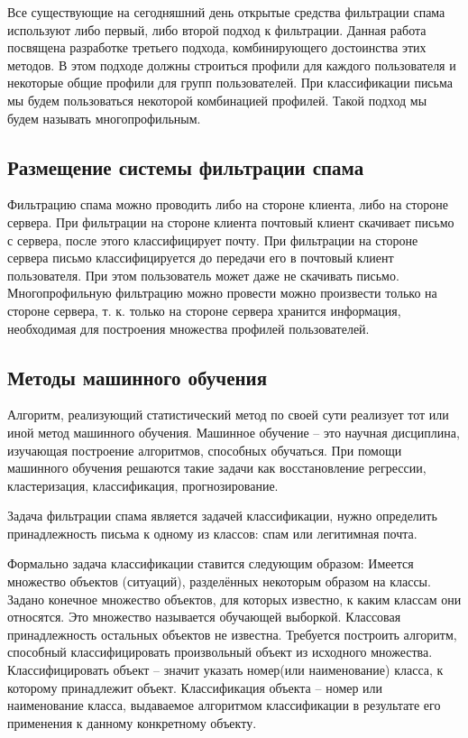 Все существующие на сегодняшний день открытые средства фильтрации спама используют либо первый, либо второй подход к фильтрации. Данная работа посвящена разработке третьего подхода, комбинирующего достоинства этих методов. В этом подходе должны строиться профили для каждого пользователя  и некоторые общие профили для групп пользователей. При классификации письма мы будем пользоваться некоторой комбинацией профилей. Такой подход мы будем называть многопрофильным.

\subsection{Размещение системы фильтрации  спама}
Фильтрацию спама можно проводить либо на стороне клиента, либо на стороне сервера.  При фильтрации на стороне клиента почтовый клиент скачивает письмо с сервера, после этого классифицирует почту.
При фильтрации на стороне сервера письмо классифицируется до передачи его в почтовый клиент пользователя. При этом пользователь может даже не скачивать письмо. Многопрофильную фильтрацию можно провести можно произвести только на стороне сервера, т. к. только на стороне сервера хранится информация,  необходимая для построения множества профилей пользователей.

\subsection{Методы машинного обучения}
Алгоритм, реализующий статистический метод по своей сути реализует тот или иной метод машинного обучения.
Машинное обучение – это научная дисциплина, изучающая построение алгоритмов, способных обучаться. При помощи машинного обучения решаются такие задачи как восстановление регрессии, кластеризация, классификация, прогнозирование.

Задача фильтрации спама является задачей классификации, нужно определить принадлежность письма к одному из классов: спам или легитимная почта.

Формально задача классификации ставится следующим образом: Имеется множество объектов (ситуаций), разделённых некоторым образом на классы. Задано конечное множество объектов, для которых известно, к каким классам они относятся. Это множество называется обучающей выборкой. Классовая принадлежность остальных объектов не известна. Требуется построить алгоритм, способный классифицировать произвольный объект из исходного множества. Классифицировать объект – значит указать номер(или наименование) класса, к которому принадлежит объект. Классификация объекта – номер или  наименование класса, выдаваемое алгоритмом классификации в результате его применения к данному конкретному объекту.


